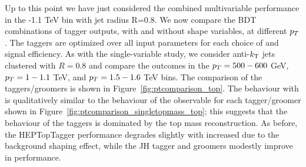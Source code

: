 %


Up to this point we have just considered the combined multivariable performance in the -1.1 TeV bin with jet radius R=0.8. We now compare the BDT combinations of tagger outputs, with and without shape variables, at different $p_T$. The taggers are optimized over all input parameters for each choice of \pt and signal efficiency. As with the single-variable study, we consider anti-$k_{\rm T}$ jets clustered with $R=0.8$ and compare the outcomes in the $p_T=500-600$ GeV, $p_T=1-1.1$ TeV, and $p_T=1.5-1.6$ TeV bins. The comparison of the taggers/groomers is shown in Figure~\ref{fig:ptcomparison_top}. The behaviour with \pt is qualitatively similar to the behaviour of the \topmass observable for each tagger/groomer shown in Figure~\ref{fig:ptcomparison_singletopmass_top}; this suggests that the \pt behaviour of the taggers is dominated by the top mass reconstruction. As before, the HEPTopTagger performance degrades slightly with increased \pt due to the background shaping effect, while the JH tagger and groomers modestly improve in performance.

